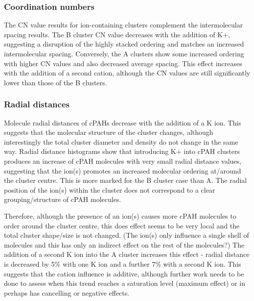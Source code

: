 \subsubsection{Coordination numbers}
The CN value results for ion-containing clusters complement the intermolecular spacing results. The B cluster CN value decreases with the addition of K+, suggesting a disruption of the highly stacked ordering and matches an increased intermolecular spacing. Conversely, the A clusters show some increased ordering with higher CN values and also decreased average spacing. This effect increases with the addition of a second cation, although the CN values are still significantly lower than those of the B clusters.


\subsubsection{Radial distances}
Molecule radial distances of cPAHs decrease %
with the addition of a K ion. This suggests that the molecular structure of the cluster changes, although interestingly the total cluster diameter and density do not change in the same way. Radial distance histograms show that introducing K+ into cPAH clusters produces an increase of cPAH molecules with very small radial distance values, suggesting that the ion(s) promotes an increased molecular ordering at/around the cluster centre. This is more marked for the B cluster case than A. 
The radial position of the ion(s) within the cluster does not correspond to a clear grouping/structure of cPAH molecules. %

Therefore, although the presence of an ion(s) causes more cPAH molecules to order around the cluster centre, this does effect seems to be very local and the total cluster shape/size is not changed.  (The ion(s) only influence a single shell of molecules and this has only an indirect effect on the rest of the molecules?)
The addition of a second K ion into the A cluster increases this effect - radial distance is decreased by 5\% with one K ion and a further 7\% with a second K ion. This suggests that the cation influence is additive, although further work needs to be done to assess when this trend reaches a saturation level (maximum effect) or in perhaps has cancelling or negative effects.


